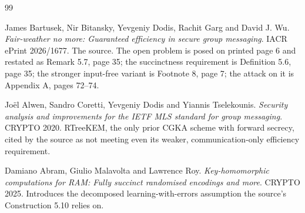 \documentclass{aicr-conjecture}
\begin{document}
\begin{aicrbibliography}{99}

James Bartusek, Nir Bitansky, Yevgeniy Dodis, Rachit Garg and David J.
Wu.
\emph{Fair-weather no more: Guaranteed efficiency in secure group
messaging}.
IACR ePrint 2026/1677.
The source. The open problem is posed on printed page 6 and restated as
Remark 5.7, page 35; the succinctness requirement is Definition 5.6,
page 35; the stronger input-free variant is Footnote 8, page 7; the
attack on it is Appendix A, pages 72--74.

Jo\"{e}l Alwen, Sandro Coretti, Yevgeniy Dodis and Yiannis Tselekounis.
\emph{Security analysis and improvements for the IETF MLS standard for
group messaging}.
CRYPTO 2020.
RTreeKEM, the only prior CGKA scheme with forward secrecy, cited by the
source as not meeting even its weaker, communication-only efficiency
requirement.

Damiano Abram, Giulio Malavolta and Lawrence Roy.
\emph{Key-homomorphic computations for RAM: Fully succinct randomised
encodings and more}.
CRYPTO 2025.
Introduces the decomposed learning-with-errors assumption the source's
Construction 5.10 relies on.

\end{aicrbibliography}
\end{document}
